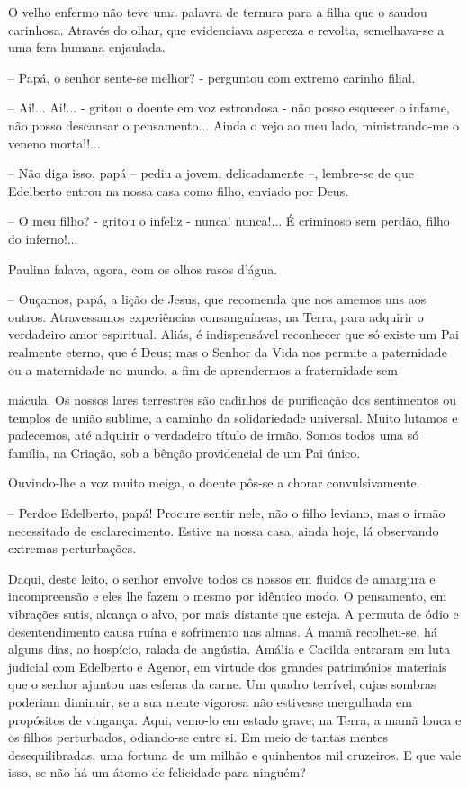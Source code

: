 \documentclass[portuguese,12pt,a4paper]{scrbook}
\begin{document}
	O velho enfermo não teve uma palavra de ternura para a filha que o saudou carinhosa. Através do olhar, que evidenciava aspereza e revolta, semelhava-se a uma fera humana enjaulada.
	
	– Papá, o senhor sente-se melhor? - perguntou com extremo carinho filial.
	
	– Ai!... Ai!... - gritou o doente em voz estrondosa - não posso esquecer o infame, não posso descansar o pensamento... Ainda o vejo ao meu lado, ministrando-me o veneno mortal!...
	
	– Não diga isso, papá – pediu a jovem, delicadamente –, lembre-se de que Edelberto entrou na nossa casa como filho, enviado por Deus.
	
	– O meu filho? - gritou o infeliz - nunca! nunca!... É criminoso sem perdão, filho do inferno!...
	
	Paulina falava, agora, com os olhos rasos d’água.
	
	– Ouçamos, papá, a lição de Jesus, que recomenda que nos amemos uns aos outros. Atravessamos experiências consanguíneas, na Terra, para adquirir o verdadeiro amor espiritual. Aliás, é indispensável reconhecer que só existe um Pai realmente eterno, que é Deus; mas o Senhor da Vida nos permite a paternidade ou a maternidade no mundo, a fim de aprendermos a fraternidade sem
	
	
	mácula. Os nossos lares terrestres são cadinhos de purificação dos sentimentos ou templos de união sublime, a caminho da solidariedade universal. Muito lutamos e padecemos, até adquirir o verdadeiro título de irmão. Somos todos uma só família, na Criação, sob a bênção providencial de um Pai único.
	
	Ouvindo-lhe a voz muito meiga, o doente pôs-se a chorar convulsivamente.
	
	– Perdoe Edelberto, papá! Procure sentir nele, não o filho leviano, mas o irmão necessitado de esclarecimento. Estive na nossa casa, ainda hoje, lá observando extremas perturbações.
	
	Daqui, deste leito, o senhor envolve todos os nossos em fluidos de amargura e incompreensão e eles lhe fazem o mesmo por idêntico modo. O pensamento, em vibrações sutis, alcança o alvo, por mais distante que esteja. A permuta de ódio e desentendimento causa ruína e sofrimento nas almas. A mamã recolheu-se, há alguns dias, ao hospício, ralada de angústia. Amália e Cacilda entraram em luta judicial com Edelberto e Agenor, em virtude dos grandes patrimónios materiais que o senhor ajuntou nas esferas da carne. Um quadro terrível, cujas sombras poderiam diminuir, se a sua mente vigorosa não estivesse mergulhada em propósitos de vingança. Aqui, vemo-lo em estado grave; na Terra, a mamã louca e os filhos perturbados, odiando-se entre si. Em meio de tantas mentes desequilibradas, uma fortuna de um milhão e quinhentos mil cruzeiros. E que vale isso, se não há um átomo de felicidade para ninguém?
	
\end{document}

